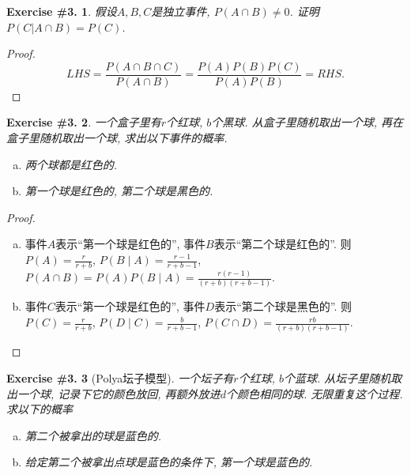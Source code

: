 \documentclass[UTF8, a4paper]{article}
\newtheorem{exercise}{Exercise \#3.}
\begin{document}
\begin{framed}
\begin{exercise}
    假设\(A, B, C\)是独立事件, \(P(A \cap B) \neq 0\). 证明 \(P(C | A\cap B) = P(C)\).
\end{exercise}
\end{framed}

\begin{proof}
$$
LHS = \frac{P(A\cap B\cap C)}{P(A\cap B)} = \frac{P(A)P(B)P(C)}{P(A)P(B)} = RHS.
$$
\end{proof}

\begin{framed}
\begin{exercise}
    一个盒子里有\(r\)个红球, \(b\)个黑球. 从盒子里随机取出一个球, 再在盒子里随机取出一个球, 求出以下事件的概率.
    \begin{enumerate}[a)]
        \item 两个球都是红色的.
        \item 第一个球是红色的, 第二个球是黑色的.
    \end{enumerate}
\end{exercise}
\end{framed}

\begin{proof}
\begin{enumerate}[a)]
    \item 事件\(A\)表示``第一个球是红色的'', 事件\(B\)表示``第二个球是红色的''. 则\(P(A) = \frac{r}{r+b}\), \(P(B \mid A) = \frac{r-1}{r+b-1}\), \(P(A\cap B) = P(A) P(B \mid A)= \frac{r(r-1)}{(r+b)(r+b-1)}\).
    \item 事件\(C\)表示``第一个球是红色的'', 事件\(D\)表示``第二个球是黑色的''. 则\(P(C) = \frac{r}{r+b}\), \(P(D \mid C) = \frac{b}{r+b - 1}\), \(P(C\cap D) = \frac{rb}{(r+b)(r+b-1)}\).
\end{enumerate}
\end{proof}



\begin{framed}
\begin{exercise}[Polya坛子模型]
    一个坛子有\(r\)个红球, \(b\)个蓝球. 从坛子里随机取出一个球, 记录下它的颜色放回, 再额外放进\(d\)个颜色相同的球. 无限重复这个过程. 求以下的概率 
    \begin{enumerate}[a)]
        \item 第二个被拿出的球是蓝色的.
        \item 给定第二个被拿出点球是蓝色的条件下, 第一个球是蓝色的.
    \end{enumerate}
\end{exercise}
\end{framed}
\end{document}

